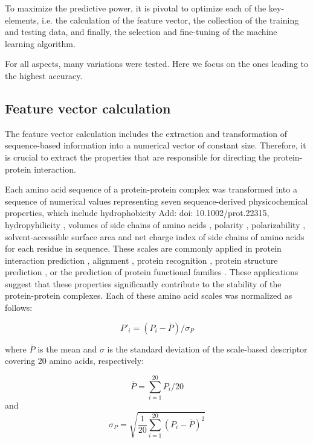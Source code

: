 \documentclass[preprint,3p,times,twocolumn]{elsarticle}
\newcommand{\TODO}[1] {\begingroup\color{red}#1\endgroup}
\begin{document}
To maximize the predictive power, it is pivotal to optimize each of the key-elements, i.e. the calculation of the feature vector, the collection of the training and testing data, and finally, the selection and fine-tuning of the machine learning algorithm.

For all aspects, many variations were tested. Here we focus on the ones leading to the highest accuracy.


\subsection{Feature vector calculation}
The feature vector calculation includes the extraction and transformation of sequence-based information into a numerical vector of constant size. Therefore, it is crucial to extract the properties that are responsible for directing the protein-protein interaction.

Each amino acid sequence of a protein-protein complex was transformed into a sequence of numerical values representing seven sequence-derived physicochemical properties, which include hydrophobicity \cite{Eisenberg:1984} \TODO{Add: doi: 10.1002/prot.22315}, hydropyhilicity \cite{Hopp:1981}, volumes of side chains of amino acids \cite{Krigbaum:1979}, polarity \cite{Grantham:1974}, polarizability \cite{Charton:1982}, solvent-accessible
surface area \cite{Rose:1985} and net charge index of side chains of amino acids \cite{Zhou:2006} for each residue in sequence.
These scales are commonly applied in protein interaction prediction \cite{Bock:2001} \cite{Bock:2003}, alignment \cite{DOI:10.1371/journal.pone.0057731}, protein recognition \cite{Ding:2001}, protein structure prediction \cite{DOI:10.1007/s00894-009-0454-9}, or the prediction of protein functional families \cite{Cai:2003}.
These applications suggest that these properties significantly contribute to the stability of the protein-protein complexes. Each of these amino acid scales was normalized as follows:

\begin{equation}
P'_{i} = (P_i - \overline{P}) / \sigma_P
\end{equation}

where $\overline{P}$ is the mean and $\sigma$ is the standard deviation of the scale-based descriptor covering 20 amino acids, respectively:

\begin{equation}
\overline{P} = \sum^{20}_{i=1}P_i / 20
\end{equation}
 and 
\begin{equation}
\sigma_P = \sqrt{\frac{1}{20} \sum^{20}_{i=1}(P_i - \overline{P})^2}
\end{equation}
\end{document}
